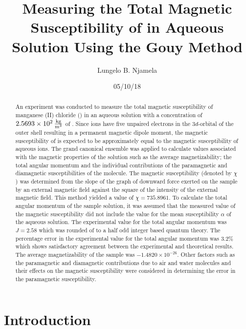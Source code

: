 \documentclass[a4paper,11pt]{article}
\title{Measuring the Total Magnetic Susceptibility of \ch{MnCl2} in Aqueous Solution Using the Gouy Method}
\author{Lungelo B. Njamela}
\date{05/10/18}
\begin{document}
\maketitle

\begin{abstract}
An experiment was conducted to measure the total magnetic susceptibility of manganese (II) chloride () in an aqueous solution with a concentration of $\SI{2.5693d2}{\kilogram\per\cubic\meter}$ of . Since  ions have five unpaired electrons in the $3d$-orbital of the outer shell resulting in a permanent magnetic dipole moment, the magnetic susceptibility of  is expected to be approximately equal to the magnetic susceptibility of aqueous  ions. The grand canonical ensemble was applied to calculate values associated with the magnetic properties of the  solution such as the average magnetizability; the total angular momentum and the individual contributions of the paramagnetic and diamagnetic susceptibilities of the molecule. The magnetic susceptibility (denoted by $\chi$) was determined from the slope of the graph of downward force exerted on the sample by an external magnetic field against the square of the intensity of the external magnetic field. This method yielded a value of $\chi = 735.8961$. To calculate the total angular momentum of the sample solution, it was assumed that the measured value of the magnetic susceptibility did not include the value for the mean susceptibility $\alpha$ of the aqueous solution. The experimental value for the total angular momentum was $J = 2.58$ which was rounded of to a half odd integer based quantum theory. The percentage error in the experimental value for the total angular momentum was $3.2\%$ which shows satisfactory agreement between the experimental and theoretical results. The average magnetizability of the sample was $-1.4820 \times 10^{-26}$. Other factors such as the paramagnetic and diamagnetic contributions due to air and water molecules and their effects on the magnetic susceptibility were considered in determining the error in the paramagnetic susceptibility. 
\end{abstract}

\section{Introduction}
\end{document}
